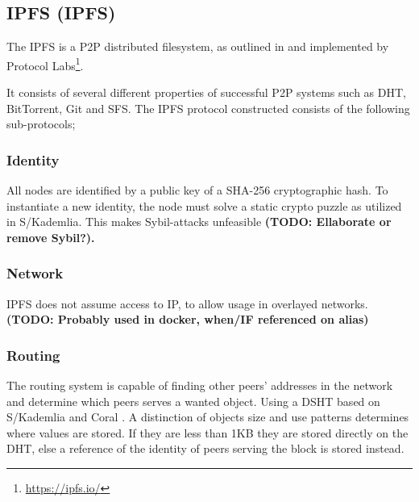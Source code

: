 \subsection{\acl{IPFS} (\acs{IPFS})}
The \acs{IPFS} is a \acs{P2P} distributed filesystem, as outlined in \cite{benet2014ipfs} and implemented by Protocol Labs\footnote{\url{https://ipfs.io/}}.

It consists of several different properties of successful \acs{P2P} systems such as \acs{DHT}, BitTorrent, Git and \ac{SFS}. The \acs{IPFS} protocol constructed consists of the following sub-protocols;

\subsubsection{Identity}
All nodes are identified by a public key of a SHA-256 cryptographic hash. To instantiate a new identity, the node must solve a static crypto puzzle as utilized in S/Kademlia\cite{baumgart2007skademlia}. This makes Sybil-attacks unfeasible \textbf{(TODO: Ellaborate or remove Sybil?).}

\subsubsection{Network}
IPFS does not assume access to IP, to allow usage in overlayed networks. \textbf{(TODO: Probably used in docker, when/IF referenced on alias)}

\subsubsection{Routing}
The routing system is capable of finding other peers' addresses in the network and determine which peers serves a wanted object. Using a \acs{DSHT} based on S/Kademlia and Coral \cite{baumgart2007skademlia, freedman2004coral}. A distinction of objects size and use patterns determines where values are stored. If they are less than 1KB they are stored directly on the \acs{DHT}, else a reference of the identity of peers serving the block is stored instead. 

